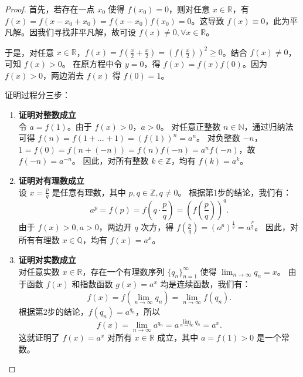 \documentclass[lang=cn,10pt,thmcnt=section]{elegantbook}
\begin{document}
\begin{proof}
		首先，若存在一点 $x_0$ 使得 $f(x_0)=0$，则对任意 $x \in \mathbb{R}$，有 $f(x) = f(x-x_0+x_0) = f(x-x_0)f(x_0)=0$。这导致 $f(x) \equiv 0$，此为平凡解。因我们寻找非平凡解，故可设 $f(x) \neq 0, \forall x \in \mathbb{R}$。
		
		于是，对任意 $x \in \mathbb{R}$，$f(x) = f(\frac{x}{2}+\frac{x}{2}) = \left(f(\frac{x}{2})\right)^2 \ge 0$。结合 $f(x) \neq 0$，可知 $f(x) > 0$。
		在原方程中令 $y=0$，得 $f(x) = f(x)f(0)$。因为 $f(x)>0$，两边消去 $f(x)$ 得 $f(0)=1$。
		
		证明过程分三步：
		\begin{enumerate}
			\item \textbf{证明对整数成立} \\
			令 $a = f(1)$。由于 $f(x)>0$，$a>0$。
			对任意正整数 $n \in \mathbb{N}$，通过归纳法可得 $f(n) = f(1+\dots+1) = (f(1))^n = a^n$。
			对负整数 $-n$，$1 = f(0) = f(n+(-n)) = f(n)f(-n) = a^n f(-n)$，故 $f(-n) = a^{-n}$。
			因此，对所有整数 $k \in \mathbb{Z}$，均有 $f(k) = a^k$。
		
			\item \textbf{证明对有理数成立} \\
			设 $x = \frac{p}{q}$ 是任意有理数，其中 $p, q \in \mathbb{Z}, q \neq 0$。
			根据第1步的结论，我们有：
			\[
			a^p = f(p) = f\left(q \cdot \frac{p}{q}\right) = \left(f\left(\frac{p}{q}\right)\right)^q.
			\]
			由于 $f(x)>0, a>0$，两边开 $q$ 次方，得 $f(\frac{p}{q}) = (a^p)^{\frac{1}{q}} = a^{\frac{p}{q}}$。
			因此，对所有有理数 $x \in \mathbb{Q}$，均有 $f(x) = a^x$。
		
			\item \textbf{证明对实数成立} \\
			对任意实数 $x \in \mathbb{R}$，存在一个有理数序列 $\{q_n\}_{n=1}^\infty$ 使得 $\lim_{n\to\infty} q_n = x$。
			由于函数 $f(x)$ 和指数函数 $g(x)=a^x$ 均是连续函数，我们有：
			\[
			f(x) = f\left(\lim_{n\to\infty} q_n\right) = \lim_{n\to\infty} f(q_n).
			\]
			根据第2步的结论，$f(q_n) = a^{q_n}$，所以
			\[
			f(x) = \lim_{n\to\infty} a^{q_n} = a^{\lim_{n\to\infty} q_n} = a^x.
			\]
			这就证明了 $f(x) = a^x$ 对所有 $x \in \mathbb{R}$ 成立，其中 $a=f(1)>0$ 是一个常数。
		\end{enumerate}
\end{proof}
\end{document}
